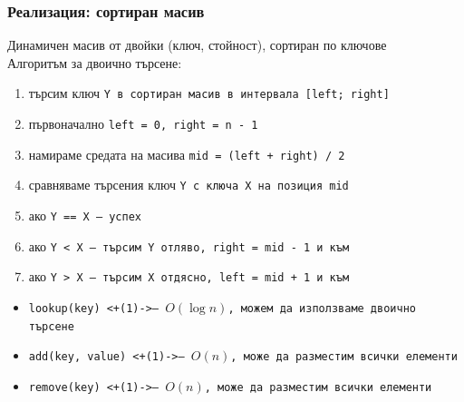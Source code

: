 \documentclass[alsotrans,beameroptions={aspectratio=169}]{beamerswitch}
\begin{document}
\begin{frame}
  \frametitle{Реализация: сортиран масив}
  Динамичен масив от двойки (ключ, стойност), сортиран по ключове\\
  \pause
  Алгоритъм за двоично търсене:
  \begin{enumerate}
  \item търсим ключ \tt Y в сортиран масив в интервала \tt{[left; right]}
  \item първоначално \tt{left = 0}, \tt{right = n - 1}
  \item\label{it:start}  намираме средата на масива \tt{mid = (left + right) / 2}
  \item сравняваме търсения ключ \tt Y с ключа \tt X на позиция mid
  \item ако \tt{Y == X} --- успех
  \item ако \tt{Y < X} --- търсим \tt Y отляво, \tt{right = mid - 1} и към \ballref{\ref{it:start}}
  \item ако \tt{Y > X} --- търсим \tt X отдясно, \tt{left = mid + 1} и към \ballref{\ref{it:start}}
  \end{enumerate}
  \pause
  \begin{itemize}
  \item \tt{lookup(key)} \onslide<+(1)->{--- $O(\log n)$, можем да използваме двоично търсене}
  \item \tt{add(key, value)} \onslide<+(1)->{--- $O(n)$, може да разместим всички елементи}
  \item \tt{remove(key)} \onslide<+(1)->{--- $O(n)$, може да разместим всички елементи}
  \end{itemize}
\end{frame}
\end{document}
